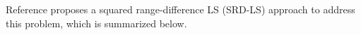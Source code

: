 Reference \cite{BeckStLi} proposes a squared range-difference LS (SRD-LS) approach to address this problem, which is summarized below.

